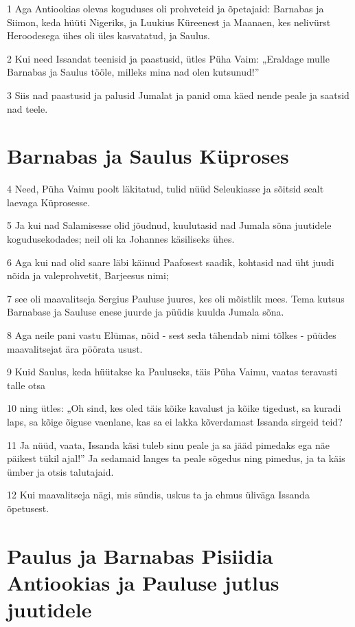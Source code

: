 \par 1 Aga Antiookias olevas koguduses oli prohveteid ja õpetajaid: Barnabas ja Siimon, keda hüüti Nigeriks, ja Luukius Küreenest ja Maanaen, kes nelivürst Heroodesega ühes oli üles kasvatatud, ja Saulus.
\par 2 Kui need Issandat teenisid ja paastusid, ütles Püha Vaim: „Eraldage mulle Barnabas ja Saulus tööle, milleks mina nad olen kutsunud!”
\par 3 Siis nad paastusid ja palusid Jumalat ja panid oma käed nende peale ja saatsid nad teele.

\section*{Barnabas ja Saulus Küproses}

\par 4 Need, Püha Vaimu poolt läkitatud, tulid nüüd Seleukiasse ja sõitsid sealt laevaga Küprosesse.
\par 5 Ja kui nad Salamisesse olid jõudnud, kuulutasid nad Jumala sõna juutidele kogudusekodades; neil oli ka Johannes käsiliseks ühes.
\par 6 Aga kui nad olid saare läbi käinud Paafosest saadik, kohtasid nad üht juudi nõida ja valeprohvetit, Barjeesus nimi;
\par 7 see oli maavalitseja Sergius Pauluse juures, kes oli mõistlik mees. Tema kutsus Barnabase ja Sauluse enese juurde ja püüdis kuulda Jumala sõna.
\par 8 Aga neile pani vastu Elümas, nõid - sest seda tähendab nimi tõlkes - püüdes maavalitsejat ära pöörata usust.
\par 9 Kuid Saulus, keda hüütakse ka Pauluseks, täis Püha Vaimu, vaatas teravasti talle otsa
\par 10 ning ütles: „Oh sind, kes oled täis kõike kavalust ja kõike tigedust, sa kuradi laps, sa kõige õiguse vaenlane, kas sa ei lakka kõverdamast Issanda sirgeid teid?
\par 11 Ja nüüd, vaata, Issanda käsi tuleb sinu peale ja sa jääd pimedaks ega näe päikest tükil ajal!” Ja sedamaid langes ta peale sõgedus ning pimedus, ja ta käis ümber ja otsis talutajaid.
\par 12 Kui maavalitseja nägi, mis sündis, uskus ta ja ehmus üliväga Issanda õpetusest.

\section*{Paulus ja Barnabas Pisiidia Antiookias ja Pauluse jutlus juutidele}

